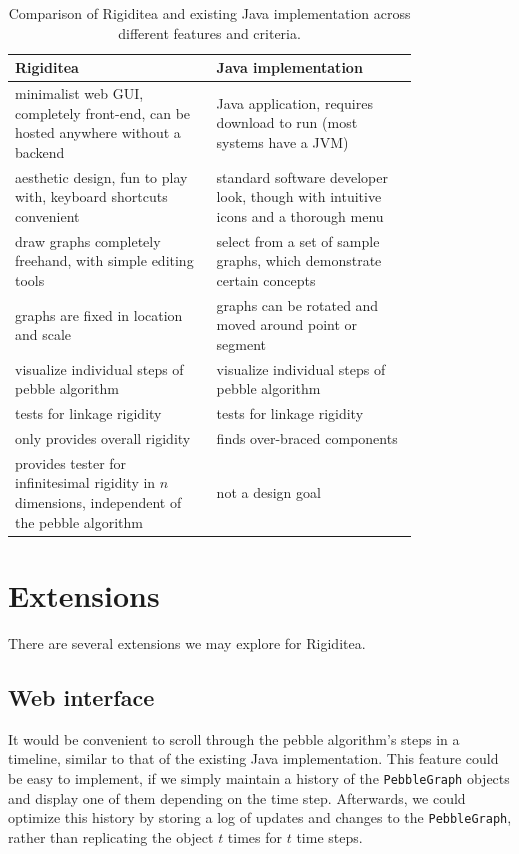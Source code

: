 \documentclass[aps,prd,final,twocolumn,letterpaper,nofootinbib]{revtex4-1}
\begin{document}
\begin{table}[ht]
\def\arraystretch{1.5}
\caption{Comparison of Rigiditea and existing Java implementation
across different features and criteria.}
\begin{tabular}{p{0.4\linewidth} | p{0.4\linewidth}}
Rigiditea & Java implementation \\ \hline
minimalist web GUI, completely front-end, can be hosted anywhere
without a backend &
Java application, requires download to run (most systems have a JVM) \\
aesthetic design, fun to play with, keyboard shortcuts convenient &
standard software developer look, though with intuitive icons
and a thorough menu\\
draw graphs completely freehand,
with simple editing tools &
select from a set of sample graphs,
which demonstrate certain concepts \\
graphs are fixed in location and scale &
graphs can be rotated and moved around point or segment \\
visualize individual steps of pebble algorithm &
visualize individual steps of pebble algorithm\\
tests for linkage rigidity & tests for linkage rigidity\\
only provides overall rigidity & finds over-braced components \\
provides tester for infinitesimal rigidity in $n$ dimensions,
independent of the pebble algorithm
& not a design goal
\end{tabular}
\label{tab:comp}
\end{table}

\section{Extensions}

There are several extensions we may explore for Rigiditea.

\subsection{Web interface}

It would be convenient to scroll through the pebble algorithm's steps
in a timeline, similar to that of the existing Java implementation.
This feature could be easy to implement,
if we simply maintain a history of the \texttt{PebbleGraph} objects
and display one of them depending on the time step.
Afterwards, we could optimize this history by storing a log
of updates and changes to the \texttt{PebbleGraph},
rather than replicating the object $t$ times for $t$ time steps.
\end{document}
